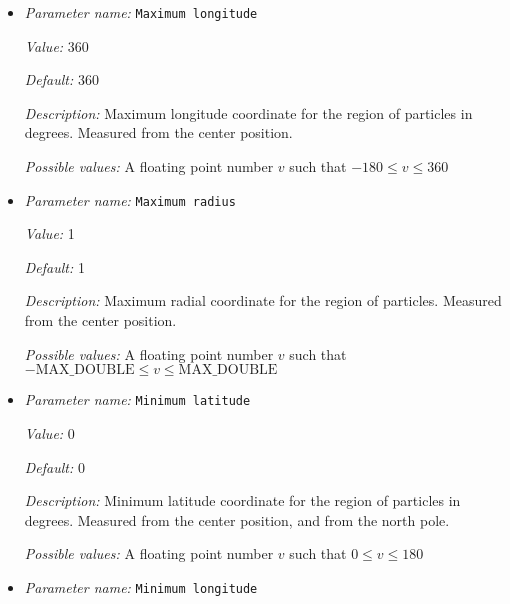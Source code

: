 \begin{itemize}
{\it Description:} Maximum latitude coordinate for the region of particles in degrees. Measured from the center position, and from the north pole.


{\it Possible values:} A floating point number $v$ such that $0 \leq v \leq 180$
\item {\it Parameter name:} {\tt Maximum longitude}
\label{parameters:Postprocess/Particles/Generator/Uniform radial/Maximum longitude}


{\it Value:} 360


{\it Default:} 360


{\it Description:} Maximum longitude coordinate for the region of particles in degrees. Measured from the center position.


{\it Possible values:} A floating point number $v$ such that $-180 \leq v \leq 360$
\item {\it Parameter name:} {\tt Maximum radius}
\label{parameters:Postprocess/Particles/Generator/Uniform radial/Maximum radius}


{\it Value:} 1


{\it Default:} 1


{\it Description:} Maximum radial coordinate for the region of particles. Measured from the center position.


{\it Possible values:} A floating point number $v$ such that $-\text{MAX\_DOUBLE} \leq v \leq \text{MAX\_DOUBLE}$
\item {\it Parameter name:} {\tt Minimum latitude}
\label{parameters:Postprocess/Particles/Generator/Uniform radial/Minimum latitude}


{\it Value:} 0


{\it Default:} 0


{\it Description:} Minimum latitude coordinate for the region of particles in degrees. Measured from the center position, and from the north pole.


{\it Possible values:} A floating point number $v$ such that $0 \leq v \leq 180$
\item {\it Parameter name:} {\tt Minimum longitude}
\label{parameters:Postprocess/Particles/Generator/Uniform radial/Minimum longitude}



\end{itemize}
